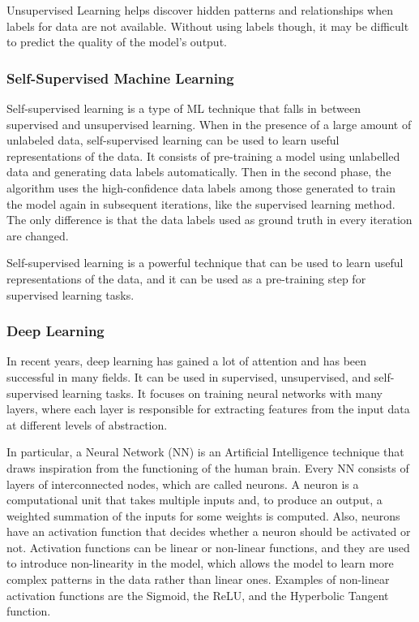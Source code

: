 Unsupervised Learning helps discover hidden patterns and relationships when labels for data are not available.
Without using labels though, it may be difficult to predict the quality of the model's output.





\subsubsection{Self-Supervised Machine Learning}
\label{sec:semisupervised_ml}
Self-supervised learning is a type of ML technique that falls in between supervised and unsupervised learning.
When in the presence of a large amount of unlabeled data, self-supervised learning can be used to learn useful representations of the data.
It consists of pre-training a model using unlabelled data and generating data labels automatically. Then in the second phase, the algorithm uses the high-confidence data labels among those generated to train the model again in subsequent iterations, like the supervised learning method. The only difference is that the data labels used as ground truth in every iteration are changed.

Self-supervised learning is a powerful technique that can be used to learn useful representations of the data, and it can be used as a pre-training step for supervised learning tasks.




\subsubsection{Deep Learning}
\label{sec:dl}
In recent years, deep learning has gained a lot of attention and has been successful in many fields.
It can be used in supervised, unsupervised, and self-supervised learning tasks. It focuses on training neural networks with many layers, where each layer is responsible for extracting features from the input data at different levels of abstraction.

In particular, a Neural Network (NN) is an Artificial Intelligence technique that draws inspiration from the functioning of the human brain.
Every NN consists of layers of interconnected nodes, which are called neurons.
A neuron is a computational unit that takes multiple inputs and, to produce an output, a weighted summation of the inputs for some weights is computed.
Also, neurons have an activation function that decides whether a neuron should be activated or not.
Activation functions can be linear or non-linear functions, and they are used to introduce non-linearity in the model, which allows the model to learn more complex patterns in the data rather than linear ones.
Examples of non-linear activation functions are the Sigmoid, the ReLU, and the Hyperbolic Tangent function.


